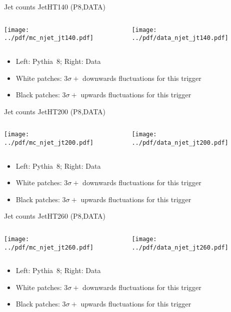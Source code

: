 \documentclass[9pt]{beamer}
\begin{document}
\begin{frame}[t]{Jet counts JetHT140 (P8,DATA)}
\begin{columns}[T]
  \begin{column}{.5\textwidth}
  \texttt{[image: ../pdf/mc\_njet\_jt140.pdf]}
  \end{column}
  \begin{column}{.5\textwidth}
  \texttt{[image: ../pdf/data\_njet\_jt140.pdf]}
  \end{column}
\end{columns}
\begin{itemize}
 \item Left: Pythia~8; Right: Data
 \item White patches: $3\sigma+$ downwards fluctuations for this trigger
 \item Black patches: $3\sigma+$ upwards fluctuations for this trigger
\end{itemize}
\end{frame}

\begin{frame}[t]{Jet counts JetHT200 (P8,DATA)}
\begin{columns}[T]
  \begin{column}{.5\textwidth}
  \texttt{[image: ../pdf/mc\_njet\_jt200.pdf]}
  \end{column}
  \begin{column}{.5\textwidth}
  \texttt{[image: ../pdf/data\_njet\_jt200.pdf]}
  \end{column}
\end{columns}
\begin{itemize}
 \item Left: Pythia~8; Right: Data
 \item White patches: $3\sigma+$ downwards fluctuations for this trigger
 \item Black patches: $3\sigma+$ upwards fluctuations for this trigger
\end{itemize}
\end{frame}

\begin{frame}[t]{Jet counts JetHT260 (P8,DATA)}
\begin{columns}[T]
  \begin{column}{.5\textwidth}
  \texttt{[image: ../pdf/mc\_njet\_jt260.pdf]}
  \end{column}
  \begin{column}{.5\textwidth}
  \texttt{[image: ../pdf/data\_njet\_jt260.pdf]}
  \end{column}
\end{columns}
\begin{itemize}
 \item Left: Pythia~8; Right: Data
 \item White patches: $3\sigma+$ downwards fluctuations for this trigger
 \item Black patches: $3\sigma+$ upwards fluctuations for this trigger
\end{itemize}
\end{frame}
\end{document}
